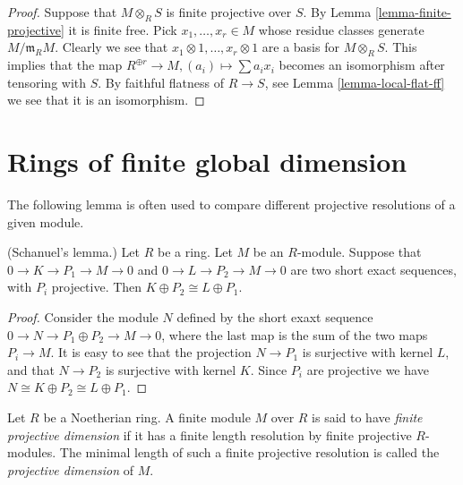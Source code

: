 \begin{proof}
Suppose that $M\otimes_R S$ is finite projective
over $S$. By Lemma \ref{lemma-finite-projective}
it is finite free. Pick $x_1, \ldots, x_r \in M$ whose
residue classes generate $M/\mathfrak m_RM$. Clearly
we see that $x_1 \otimes 1, \ldots, x_r \otimes 1$
are a basis for $M \otimes_R S$. This implies that
the map $R^{\oplus r} \to M, (a_i) \mapsto \sum a_i x_i$
becomes an isomorphism after tensoring with $S$.
By faithful flatness of $R \to S$, see Lemma \ref{lemma-local-flat-ff}
we see that it is an isomorphism.
\end{proof}












\section{Rings of finite global dimension}
\label{section-ring-finite-gl-dim}

\noindent
The following lemma is often used to compare different
projective resolutions of a given module.

\begin{lemma}
\label{lemma-Schanuel}
(Schanuel's lemma.)
Let $R$ be a ring. Let $M$ be an $R$-module.
Suppose that $0 \to K \to P_1 \to M \to 0$
and $0 \to L \to P_2 \to M \to 0$ are two short exact
sequences, with $P_i$ projective.
Then $K \oplus P_2 \cong L \oplus P_1$.
\end{lemma}

\begin{proof}
Consider the module
$N$ defined by the short exaxt sequence
$0 \to N \to P_1 \oplus P_2 \to M \to 0$,
where the last map is the sum of the two maps
$P_i \to M$. It is easy to see that the projection
$N \to P_1$ is surjective with kernel $L$, and that
$N \to P_2$ is surjective with kernel $K$.
Since $P_i$ are projective we have $N \cong K \oplus P_2
\cong L \oplus P_1$.
\end{proof}

\begin{definition}
\label{definition-finite-proj-dim}
Let $R$ be a Noetherian ring.
A finite module $M$ over $R$ is said to have {\it finite
projective dimension} if it has a finite length resolution by finite
projective $R$-modules. The minimal length of such a
finite projective resolution is called the {\it projective
dimension} of $M$.
\end{definition}

